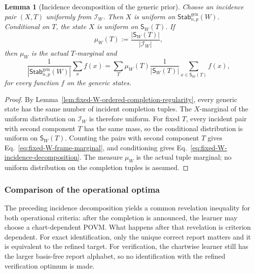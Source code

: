 \documentclass[11pt]{article}
\newcommand{\1}{\mathbf 1}
\theoremstyle{plain}
\newtheorem{lemma}[theorem]{Lemma}
\theoremstyle{definition}
\theoremstyle{remark}
\begin{document}
\begin{lemma}[Incidence decomposition of the generic prior]
\label{lem:uniform-frame-generic-decomposition}
Choose an incidence pair $(X,T)$ uniformly from $\mathcal I_W$.  Then $X$ is
uniform on $\mathsf{Stab}_{n,p}^{\mathrm{gen}}(W)$.  Conditional on $T$, the state
$X$ is uniform on $\mathsf S_W(T)$.  If
\begin{equation}
 \mu_W(T):=\frac{|\mathsf S_W(T)|}{|\mathcal I_W|},
 \label{eq:fixed-W-frame-marginal}
\end{equation}
then $\mu_W$ is the actual $T$-marginal and
\begin{equation}
 \frac1{|\mathsf{Stab}_{n,p}^{\mathrm{gen}}(W)|}\sum_x f(x)
 =\sum_T\mu_W(T)\frac1{|\mathsf S_W(T)|}
 \sum_{x\in\mathsf S_W(T)}f(x),
 \label{eq:fixed-W-incidence-decomposition}
\end{equation}
for every function $f$ on the generic states.
\end{lemma}
\begin{proof}
By Lemma~\ref{lem:fixed-W-ordered-completion-regularity}, every generic state
has the same number of incident completion tuples.  The $X$-marginal of the
uniform distribution on $\mathcal I_W$ is therefore uniform.  For fixed $T$,
every incident pair with second component $T$ has the same mass, so the
conditional distribution is uniform on $\mathsf S_W(T)$.  Counting the pairs
with second component $T$ gives Eq.~\eqref{eq:fixed-W-frame-marginal}, and
conditioning gives Eq.~\eqref{eq:fixed-W-incidence-decomposition}.  The
measure $\mu_W$ is the actual tuple marginal; no uniform distribution on the
completion tuples is assumed.
\end{proof}

\subsubsection{Comparison of the operational optima}
\label{subsubsec:transverse-operational-comparison}
The preceding incidence decomposition yields a common revelation inequality
for both operational criteria: after the completion is announced, the learner
may choose a chart-dependent POVM.  What happens after that revelation is
criterion dependent.  For exact identification, only the unique correct report
matters and it is equivalent to the refined target.  For verification, the
chartwise learner still has the larger basis-free report alphabet, so no
identification with the refined verification optimum is made.
\end{document}
